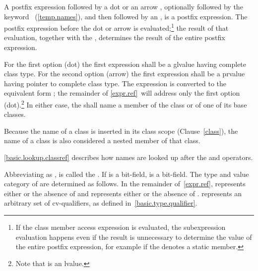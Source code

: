 \pnum
{}%
%
%
%
%
%
%
%
%
%
A postfix expression followed by a dot  or an arrow \tcode{->},
optionally followed by the keyword
~(\ref{temp.names}), and then followed by an
, is a postfix expression. The postfix
expression before the dot or arrow is evaluated;\footnote{If the class member
access expression is evaluated, the subexpression evaluation happens even if the
result is unnecessary to determine
the value of the entire postfix expression, for example if the
 denotes a static member.}
the result of that evaluation, together with the
, determines the result of the entire postfix
expression.

\pnum
{}%
For the first option (dot) the first expression
shall be a glvalue having complete class type.
For the second option (arrow) the first expression
shall be a prvalue having pointer to complete class type.
The expression  is
converted to the equivalent form ; the remainder of
\ref{expr.ref}~will address only the first option (dot).\footnote{Note that
 is an lvalue.}
In either case, the
 shall name a member of the class or of one of
its base classes.
\begin{note}
Because the name of a class is inserted in its class scope
(Clause~\ref{class}), the name of a class is also considered a nested
member of that class.
\end{note}
\begin{note}
\ref{basic.lookup.classref} describes how names are looked up after the
 and \tcode{->} operators.
\end{note}

\pnum
Abbreviating 
as ,
 is called the .
If  is a bit-field,  is a bit-field. The
type and value category of  are determined as follows.
In the remainder of~\ref{expr.ref},  represents either
 or the absence of  and  represents
either  or the absence of . 
represents an arbitrary set of cv-qualifiers, as defined
in~\ref{basic.type.qualifier}.

